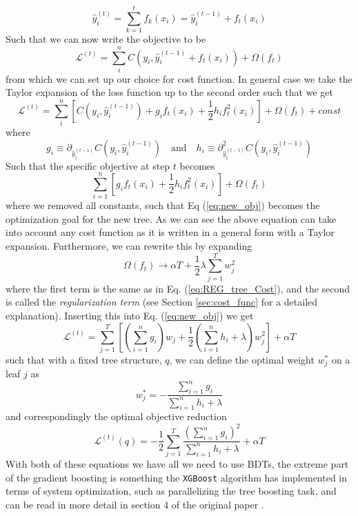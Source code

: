\documentclass[12pt, a4paper]{book}
\begin{document}
\begin{equation}\label{eq:eff_ensemble}
    \hat{y}_i^{(t)}=\sum_{k=1}^{t}f_k(x_i) = \hat{y}_i^{(t-1)}+f_t(x_i)
\end{equation}
Such that we can now write the objective to be
\begin{equation}
    \mathcal{L}^{(t)}=\sum_{i}^{n}C(y_i,\hat{y}_i^{(t-1)}+f_t(x_i))+\Omega(f_t)
\end{equation}
from which we can set up our choice for cost function. In general case we take the Taylor expansion of the loss function up to the second order such that we get
$$
    \mathcal{L}^{(t)}=\sum_{i}^{n}\left[C(y_i,\hat{y}_i^{(t-1)})+g_i f_t(x_i)+\frac{1}{2}h_i f_t^2(x_i)\right]+\Omega(f_t)+const
$$
where 
$$
    g_i \equiv \partial_{\hat{y}_i^{(t-1)}}C(y_i,\hat{y}_i^{(t-1)}) \quad\text{and}\quad   h_i \equiv \partial^2_{\hat{y}_i^{(t-1)}}C(y_i,\hat{y}_i^{(t-1)})
$$
Such that the specific objective at step $t$ becomes
\begin{equation}\label{eq:new_obj}
    \sum_{i=1}^{n}\left[ g_i f_t(x_i) +\frac{1}{2}h_i f_t^2(x_i)\right] +\Omega(f_t)
\end{equation}
where we removed all constants, such that Eq (\ref{eq:new_obj}) becomes the optimization goal for the new tree. As we can see the above equation can take into account any cost function as it is written in a general form with a Taylor expansion. Furthermore, we can rewrite this by expanding 
$$
\Omega(f_t) \rightarrow \alpha T + \frac{1}{2}\lambda\sum_{j=1}^{T} w_j^2 
$$ 
where the first term is the same as in Eq. (\ref{eq:REG_tree_Cost}), and the second is called the \textit{regularization term} (see Section \ref{sec:cost_func} for a detailed explanation). Inserting this into Eq. (\ref{eq:new_obj}) we get
$$
\mathcal{L}^{(t)} = \sum_{j=1}^{T}\left[\left(\sum_{i=1}^{n} g_i\right)w_j +\frac{1}{2}\left(\sum_{i=1}^{n} h_i +\lambda \right)w_j^2\right] +\alpha T
$$
such that with a fixed tree structure, $q$, we can define the optimal weight $w_j^*$ on a leaf $j$ as 
\begin{equation}\label{eq:opt_wgt_bdt}
    w_j^*=-\frac{\sum_{i=1}^{n} g_i}{\sum_{i=1}^{n} h_i+\lambda}
\end{equation}
and correspondingly the optimal objective reduction
\begin{equation}\label{eq:opt_obj_bdt}
    \mathcal{L}^{(t)}(q)=-\frac{1}{2}\sum_{j=1}^{T}\frac{(\sum_{i=1}^{n} g_i)^2}{\sum_{i=1}^{n} h_i+\lambda}+\alpha T
\end{equation}
With both of these equations we have all we need to use BDTs, the extreme part of the gradient boosting is something the \verb|XGBoost| algorithm has implemented in terms of system optimization, such as parallelizing the tree boosting task, and can be read in more detail in section 4 of the original paper \cite{XGBoost}.
\end{document}
